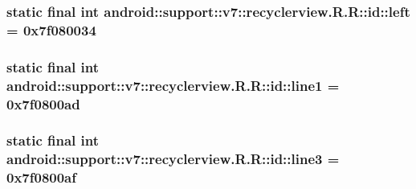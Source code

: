 \hypertarget{classandroid_1_1support_1_1v7_1_1recyclerview_1_1_r_1_1id_811157938e446a22f67e894ee404127b}{
\subsubsection[{left}]{\setlength{\rightskip}{0pt plus 5cm}static final int android::support::v7::recyclerview.R.R::id::left = 0x7f080034}}
\label{classandroid_1_1support_1_1v7_1_1recyclerview_1_1_r_1_1id_811157938e446a22f67e894ee404127b}


\hypertarget{classandroid_1_1support_1_1v7_1_1recyclerview_1_1_r_1_1id_ed4b613d130f68e1863003d100569bdf}{
\subsubsection[{line1}]{\setlength{\rightskip}{0pt plus 5cm}static final int android::support::v7::recyclerview.R.R::id::line1 = 0x7f0800ad}}
\label{classandroid_1_1support_1_1v7_1_1recyclerview_1_1_r_1_1id_ed4b613d130f68e1863003d100569bdf}


\hypertarget{classandroid_1_1support_1_1v7_1_1recyclerview_1_1_r_1_1id_4c55edbb8a078bccfed3e31d0a0b117a}{
\subsubsection[{line3}]{\setlength{\rightskip}{0pt plus 5cm}static final int android::support::v7::recyclerview.R.R::id::line3 = 0x7f0800af}}
\label{classandroid_1_1support_1_1v7_1_1recyclerview_1_1_r_1_1id_4c55edbb8a078bccfed3e31d0a0b117a}


